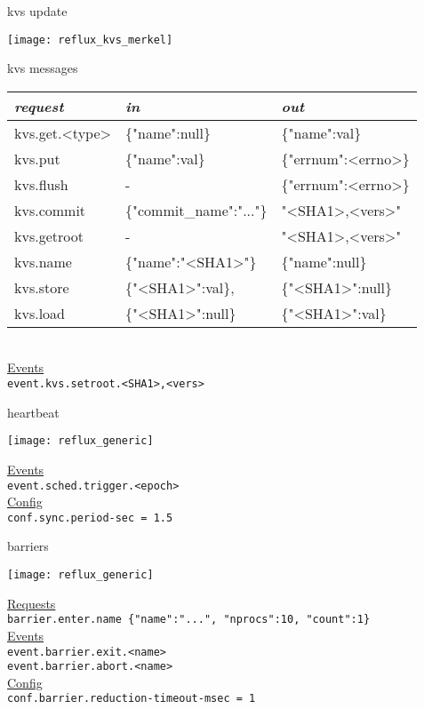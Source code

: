\documentclass[default,pdf,colorBG,slideColor]{prosper}
\begin{document}
\begin{slide}{kvs update}{\small
\begin{center}
  \texttt{[image: reflux\_kvs\_merkel]}
\end{center}
}\end{slide}

\begin{slide}{kvs messages}{\tiny
\begin{tabular}{|l|l|l|}
\hline
{\em request } & {\em in } & {\em out }\\
\hline
kvs.get.<type> & \{"name":null\}
               & \{"name":val\}\\
kvs.put        & \{"name":val\}
               & \{"errnum":<errno>\}\\
kvs.flush      & -
               & \{"errnum":<errno>\}\\
kvs.commit     & \{"commit\_name":"..."\}
               & "<SHA1>,<vers>"\\
\hline
kvs.getroot    & -
               & "<SHA1>,<vers>"\\
kvs.name       & \{"name":"<SHA1>"\}
               & \{"name":null\}\\
kvs.store      & \{"<SHA1>":val\},
               & \{"<SHA1>":null\}\\
kvs.load       & \{"<SHA1>":null\}
               & \{"<SHA1>":val\}\\
\hline
\end{tabular}\\
\underline{Events}\\
{\tt event.kvs.setroot.<SHA1>,<vers>}\\
}\end{slide}

\begin{slide}{heartbeat}{\tiny
\begin{center}
  \texttt{[image: reflux\_generic]}
\end{center}
\underline{Events}\\
{\tt event.sched.trigger.<epoch>}\\
\underline{Config}\\
{\tt conf.sync.period-sec = 1.5}\\
}\end{slide}

\begin{slide}{barriers}{\tiny
\begin{center}
  \texttt{[image: reflux\_generic]}
\end{center}
\underline{Requests}\\
{\tt barrier.enter.name \{"name":"...", "nprocs":10, "count":1\}}\\
\underline{Events}\\
{\tt event.barrier.exit.<name>}\\
{\tt event.barrier.abort.<name>}\\
\underline{Config}\\
{\tt conf.barrier.reduction-timeout-msec = 1}\\
}\end{slide}
\end{document}
